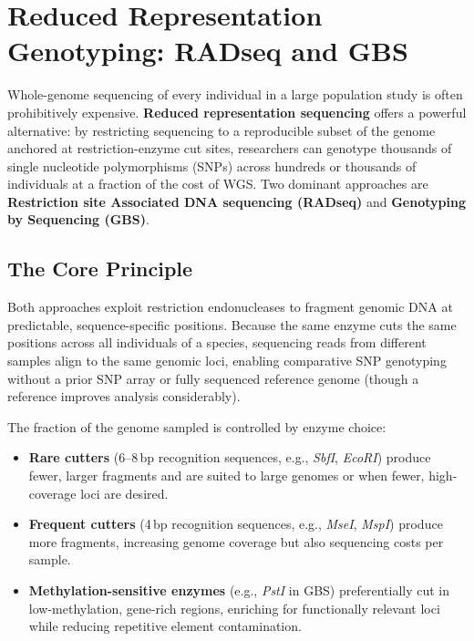 \section{Reduced Representation Genotyping: RADseq and GBS}
\label{sec:radseq-gbs}

Whole-genome sequencing of every individual in a large population study is often prohibitively expensive. \textbf{Reduced representation sequencing} offers a powerful alternative: by restricting sequencing to a reproducible subset of the genome anchored at restriction-enzyme cut sites, researchers can genotype thousands of single nucleotide polymorphisms (SNPs) across hundreds or thousands of individuals at a fraction of the cost of WGS. Two dominant approaches are \textbf{Restriction site Associated DNA sequencing (RADseq)} and \textbf{Genotyping by Sequencing (GBS)}.

\subsection{The Core Principle}
\label{subsec:radseq:principle}

Both approaches exploit restriction endonucleases to fragment genomic DNA at predictable, sequence-specific positions. Because the same enzyme cuts the same positions across all individuals of a species, sequencing reads from different samples align to the same genomic loci, enabling comparative SNP genotyping without a prior SNP array or fully sequenced reference genome (though a reference improves analysis considerably).

The fraction of the genome sampled is controlled by enzyme choice:
\begin{itemize}[nosep]
  \item \textbf{Rare cutters} (6--8\,bp recognition sequences, e.g., \textit{SbfI}, \textit{EcoRI}) produce fewer, larger fragments and are suited to large genomes or when fewer, high-coverage loci are desired.
  \item \textbf{Frequent cutters} (4\,bp recognition sequences, e.g., \textit{MseI}, \textit{MspI}) produce more fragments, increasing genome coverage but also sequencing costs per sample.
  \item \textbf{Methylation-sensitive enzymes} (e.g., \textit{PstI} in GBS) preferentially cut in low-methylation, gene-rich regions, enriching for functionally relevant loci while reducing repetitive element contamination.
\end{itemize}

